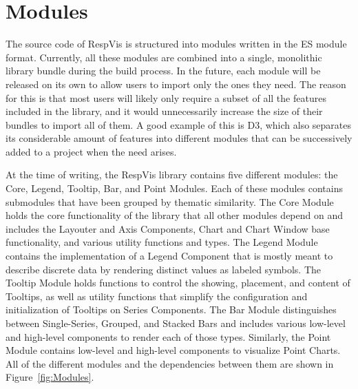 \chapter{Modules}
\label{chap:Modules}

The source code of RespVis is structured into modules written in the ES module format.
Currently, all these modules are combined into a single, monolithic library bundle during the build process.
In the future, each module will be released on its own to allow users to import only the ones they need.
The reason for this is that most users will likely only require a subset of all the features included in the library, and it would unnecessarily increase the size of their bundles to import all of them.
A good example of this is D3, which also separates its considerable amount of features into different modules that can be successively added to a project when the need arises.

At the time of writing, the RespVis library contains five different modules: the Core, Legend, Tooltip, Bar, and Point Modules.
Each of these modules contains submodules that have been grouped by thematic similarity.
The Core Module holds the core functionality of the library that all other modules depend on and includes the Layouter and Axis Components, Chart and Chart Window base functionality, and various utility functions and types.
The Legend Module contains the implementation of a Legend Component that is mostly meant to describe discrete data by rendering distinct values as labeled symbols.
The Tooltip Module holds functions to control the showing, placement, and content of Tooltips, as well as utility functions that simplify the configuration and initialization of Tooltips on Series Components.
The Bar Module distinguishes between Single-Series, Grouped, and Stacked Bars and includes various low-level and high-level components to render each of those types.
Similarly, the Point Module contains low-level and high-level components to visualize Point Charts.
All of the different modules and the dependencies between them are shown in Figure~\ref{fig:Modules}.

